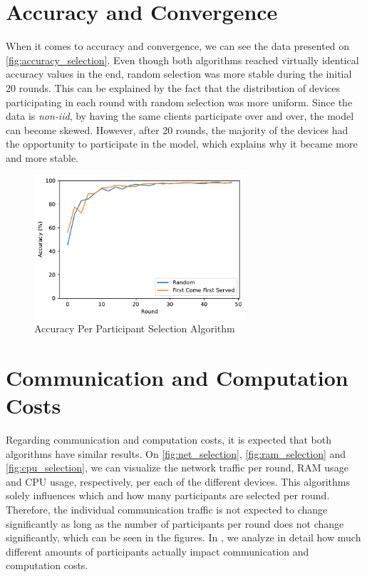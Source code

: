 \section{Accuracy and Convergence}

When it comes to accuracy and convergence, we can see the data presented on \autoref{fig:accuracy_selection}. Even though both algorithms reached virtually identical accuracy values in the end, random selection was more stable during the initial 20 rounds. This can be explained by the fact that the distribution of devices participating in each round with random selection was more uniform. Since the data is \textit{non-iid}, by having the same clients participate over and over, the model can become skewed. However, after 20 rounds, the majority of the devices had the opportunity to participate in the model, which explains why it became more and more stable.

\begin{figure}[!ht]
    \centering
    \centering
    \includegraphics[width=0.7\textwidth]{graphics/selection/accuracy.pdf}
    \caption{Accuracy Per Participant Selection Algorithm}
    \label{fig:accuracy_selection}
\end{figure}

\section{Communication and Computation Costs}

Regarding communication and computation costs, it is expected that both algorithms have similar results. On \autoref{fig:net_selection}, \autoref{fig:ram_selection} and \autoref{fig:cpu_selection}, we can visualize the network traffic per round, RAM usage and CPU usage, respectively, per each of the different devices. This algorithms solely influences which and how many participants are selected per round. Therefore, the individual communication traffic is not expected to change significantly as long as the number of participants per round does not change significantly, which can be seen in the figures. In , we analyze in detail how much different amounts of participants actually impact communication and computation costs.

